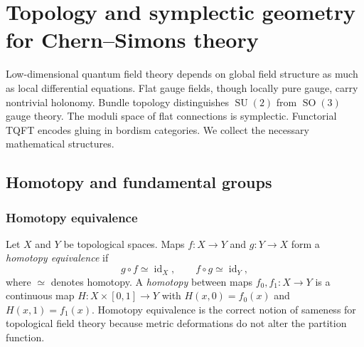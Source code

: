 
\providecommand{\dd}{\mathrm{d}}
\providecommand{\Tr}{\operatorname{Tr}}
\providecommand{\tr}{\operatorname{tr}}
\providecommand{\CS}{\operatorname{CS}}
\providecommand{\Hom}{\operatorname{Hom}}
\providecommand{\U}{\operatorname{U}}
\providecommand{\SU}{\operatorname{SU}}
\providecommand{\SO}{\operatorname{SO}}
\providecommand{\Spin}{\operatorname{Spin}}
\providecommand{\Lk}{\operatorname{Lk}}
\providecommand{\PD}{\operatorname{PD}}
\providecommand{\Hol}{\operatorname{Hol}}
\providecommand{\Bord}{\operatorname{Bord}}
\providecommand{\Vect}{\operatorname{Vect}}

\section{Topology and symplectic geometry for Chern--Simons theory}
\label{sec:topology-review}

Low-dimensional quantum field theory depends on global field structure as much as local differential equations. Flat gauge fields, though locally pure gauge, carry nontrivial holonomy. Bundle topology distinguishes $\SU(2)$ from $\SO(3)$ gauge theory. The moduli space of flat connections is symplectic. Functorial TQFT encodes gluing in bordism categories. We collect the necessary mathematical structures.

\subsection{Homotopy and fundamental groups}

\subsubsection{Homotopy equivalence}

Let $X$ and $Y$ be topological spaces. Maps $f : X \to Y$ and $g : Y \to X$ form a \emph{homotopy equivalence} if
\begin{equation}
  g \circ f \simeq \operatorname{id}_X,
  \qquad
  f \circ g \simeq \operatorname{id}_Y,
\end{equation}
where $\simeq$ denotes homotopy. A \emph{homotopy} between maps $f_0,f_1 : X \to Y$ is a continuous map $H : X \times [0,1] \to Y$ with $H(x,0)=f_0(x)$ and $H(x,1)=f_1(x)$. Homotopy equivalence is the correct notion of sameness for topological field theory because metric deformations do not alter the partition function.


